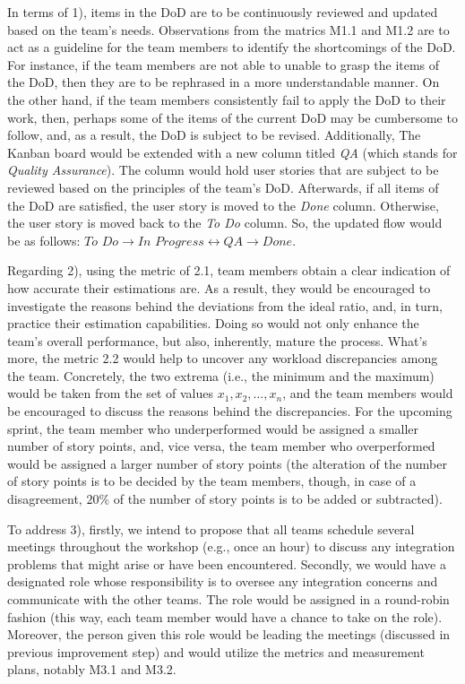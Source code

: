 \documentclass[conference]{IEEEtran}
\begin{document}
In terms of 1), items in the DoD are to be continuously reviewed and updated
based on the team's needs. Observations from the matrics M1.1 and M1.2 are to
act as a guideline for the team members to identify the shortcomings of the
DoD. For instance, if the team members are not able to unable to grasp the
items of the DoD, then they are to be rephrased in a more understandable
manner. On the other hand, if the team members consistently fail to apply the
DoD to their work, then, perhaps some of the items of the current DoD may be
cumbersome to follow, and, as a result, the DoD is subject to be revised.
Additionally, The Kanban board would be extended with a new column titled
\textit{QA} (which stands for \textit{Quality Assurance}). The column would
hold user stories that are subject to be reviewed based on the principles of
the team's DoD. Afterwards, if all items of the DoD are satisfied, the user
story is moved to the \textit{Done} column. Otherwise, the user story is moved
back to the \textit{To Do} column. So, the updated flow would be as follows:
$\textit{To Do} \to \textit{In Progress} \leftrightarrow \textit{QA} \to
\textit{Done}$.


Regarding 2), using the metric of 2.1, team members obtain a clear indication
of how accurate their estimations are. As a result, they would be encouraged to
investigate the reasons behind the deviations from the ideal ratio, and, in
turn, practice their estimation capabilities. Doing so would not only enhance
the team's overall performance, but also, inherently, mature the process.
What's more, the metric 2.2 would help to uncover any workload discrepancies
among the team. Concretely, the two extrema (i.e., the minimum and the maximum)
would be taken from the set of values $x_1, x_2, \dots, x_n$, and the team
members would be encouraged to discuss the reasons behind the discrepancies.
For the upcoming sprint, the team member who underperformed would be assigned a
smaller number of story points, and, vice versa, the team member who
overperformed would be assigned a larger number of story points (the alteration
of the number of story points is to be decided by the team members, though, in
case of a disagreement, $20\%$ of the number of story points is to be added or
subtracted).

To address 3), firstly, we intend to propose that all teams schedule several
meetings throughout the workshop (e.g., once an hour) to discuss any
integration problems that might arise or have been encountered. Secondly, we
would have a designated role whose responsibility is to oversee any integration
concerns and communicate with the other teams. The role would be assigned in a
round-robin fashion (this way, each team member would have a chance to take on
the role). Moreover, the person given this role would be leading the meetings
(discussed in previous improvement step) and would utilize the metrics and
measurement plans, notably M3.1 and M3.2.
\end{document}
